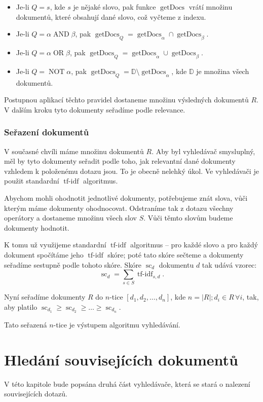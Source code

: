 \documentclass[12pt]{article}
\newcommand{\sssection}[1]{\subsubsection{#1}}
\newcommand{\addh}[1]{\left[#1\right]}
\DeclareMathOperator{\tfidf}{tf-idf}
\DeclareMathOperator{\score}{sc}
\DeclareMathOperator{\getdocs}{getDocs}
\DeclareMathOperator{\AND}{AND}
\DeclareMathOperator{\OR}{OR}
\DeclareMathOperator{\NOT}{NOT}
\begin{document}
\begin{itemize}
\item Je-li $Q=s$, kde $s$ je nějaké slovo, pak funkce $\getdocs$ vrátí množinu dokumentů, které obsahují dané slovo, což vyčteme z indexu. 
\item Je-li $Q = \alpha \AND \beta$, pak $\getdocs_Q = \getdocs_\alpha \cap \getdocs_\beta$.
\item Je-li $Q = \alpha \OR \beta$, pak $\getdocs_Q = \getdocs_\alpha \cup \getdocs_\beta$.
\item Je-li $Q = \NOT \alpha$, pak $\getdocs_Q = \mathbb{D}\setminus\getdocs_\alpha$, kde $\mathbb{D}$ je množina všech dokumentů.
\end{itemize}

Postupnou aplikací těchto pravidel dostaneme množinu výsledných dokumentů $R$. V dalším kroku tyto dokumenty seřadíme podle relevance. 

\sssection{Seřazení dokumentů}

V současné chvíli máme množinu dokumentů $R$. Aby byl vyhledávač smysluplný, měl by tyto dokumenty seřadit podle toho, jak relevantní dané dokumenty vzhledem k položenému dotazu jsou. To je obecně nelehký úkol. Ve vyhledávači je použit standardní $\tfidf$ algoritmus. 

Abychom mohli ohodnotit jednotlivé dokumenty, potřebujeme znát slova, vůči kterým máme dokumenty ohodnocovat. Odstraníme tak z dotazu všechny operátory a dostaneme množinu všech slov $S$. Vůči těmto slovům budeme dokumenty hodnotit. 

K tomu už využijeme standardní $\tfidf$ algoritmus -- pro každé slovo a pro každý dokument spočítáme jeho $\tfidf$ skóre; poté tato skóre sečteme a dokumenty seřadíme sestupně podle tohoto skóre. Skóre $\score_d$ dokumentu $d$ tak udává vzorec:
$$\score_d=\sum_{s\in S} \tfidf_{s, d}.$$

Nyní seřadíme dokumenty $R$ do $n$-tice $\addh{d_1, d_2, \ldots, d_n}$, kde $n=|R|; d_i\in R \,\forall i$, tak, aby platilo $\score_{d_1} \ge \score_{d_2} \ge \ldots \ge \score_{d_n}$.

Tato seřazená $n$-tice je výstupem algoritmu vyhledávání. 


\newpage
\section{Hledání souvisejících dokumentů}
V této kapitole bude popsána druhá část vyhledávače, která se stará o nalezení souvisejících dotazů. 
\end{document}
